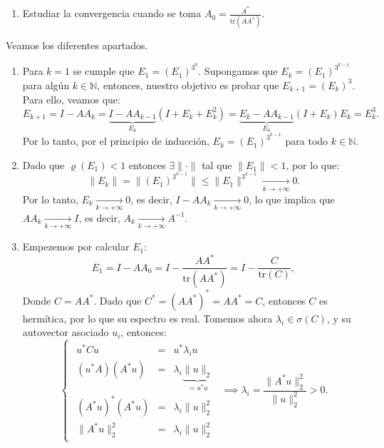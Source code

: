 {\begin{enumerate}[label=\alph*)]
    \item Estudiar la convergencia cuando se toma $\displaystyle A_0 = \frac{A^*}{\mathrm{tr}(AA^*)}$.
\end{enumerate}
}{
    Veamos los diferentes apartados.\\
    \begin{enumerate}[label=\alph*)]
        \item Para $k = 1$ se cumple que $E_1 = (E_1)^{3^0}$. Supongamos que $E_k = (E_1)^{3^{k-1}}$ para algún $k \in \mathbb{N}$, entonces, nuestro objetivo es probar que $E_{k+1} = (E_k )^3$. Para ello, veamos que:
        \[
            E_{k+1} =
            I - A A_k =
            \underbrace{I - A A_{k-1}}_{E_k} (I + E_k + E_k^2) =
            \underbrace{E_k - A A_{k-1}}_{E_k} (I + E_k) E_k =
            E_k^3.
        \]
        Por lo tanto, por el principio de inducción, $E_k = (E_1)^{3^{k-1}}$ para todo $k \in \mathbb{N}$.
        \item Dado que $\varrho(E_1) < 1$ entonces $ \exists \| \cdot \|$ tal que $\|E_1\| < 1$, por lo que:
        \[
            \|E_k\| = \|(E_1)^{3^{k-1}}\| \leq \|E_1\|^{3^{k-1}} \xrightarrow[k \to +\infty]{} 0.
        \]
        Por lo tanto, $E_k \xrightarrow[k \to +\infty]{} 0$, es decir, $I - A A_k \xrightarrow[k \to +\infty]{} 0$, lo que implica que $A A_k \xrightarrow[k \to +\infty]{} I$, es decir, $A_k \xrightarrow[k \to +\infty]{} A^{-1}$.
        \item Empezemos por calcular $E_1$:
        \[
            E_1 =
            I - A A_0 =
            I - \frac{A A^*}{\mathrm{tr}(AA^*)} =
            I - \frac{C}{\mathrm{tr}(C)},
        \]
        Donde $C = AA^*$. Dado que $C^* = (AA^*)^* = AA^* = C$, entonces $C$ es hermítica, por lo que su espectro es real. Tomemos ahora $\lambda_i \in \sigma(C)$, y su autovector asociado $u_i$, entonces:
        \[
            \begin{cases}
                \begin{array}{ccc}
                    u^* C u & = & u^* \lambda_i u \\
                    (u^* A)(A^* u) & = & \lambda_i \underbrace{\| u \|_2}_{=u^*u} \\
                    (A^* u)^* (A^* u) & = & \lambda_i \| u \|_2^2 \\
                    \| A^* u \|_2^2 & = & \lambda_i \| u \|_2^2
                \end{array}
            \end{cases}
            \implies
            \lambda_i = \frac{\| A^* u \|_2^2}{\| u \|_2^2} > 0.
\]
\end{enumerate}}
